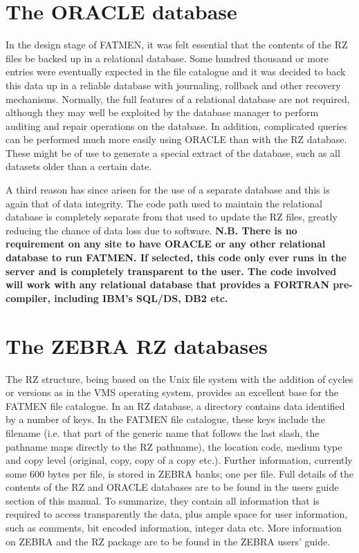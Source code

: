 \section{The ORACLE database}
\par
In the design stage of FATMEN, it was felt essential that the contents
of the RZ files be backed up in a relational database.
Some hundred thousand or more entries were eventually expected
in the file catalogue and it was decided to back this data up
in a reliable database with journaling,
rollback and other recovery mechanisms. Normally, the full features
of a relational database are not required, although they may well
be exploited by the database manager to perform auditing and
repair operations on the database. In addition, complicated queries
can be performed much more easily using ORACLE than with the RZ database.
These might be of use to generate a special extract of the database,
such as all datasets older than a certain date.
\par
A third reason has since arisen for the use of a separate database
and this is again that of data integrity.
The code path used to maintain the relational database is completely
separate from that used to update the RZ files, greatly reducing
the chance of data loss due to software.
{\bf N.B. There is no requirement on any site to have ORACLE or
any other relational database to run FATMEN. If selected,
this code only ever runs in the server and is completely transparent
to the user. The code involved will work with any relational database
that provides a FORTRAN pre-compiler, including IBM's SQL/DS, DB2 etc.
}
\section{The ZEBRA RZ databases}
\par
The RZ structure, being based on the Unix file system with the addition
of cycles or versions as in the VMS operating system, provides an
excellent base for the FATMEN file catalogue. In an RZ database,
a directory contains data identified by a number of keys. In the FATMEN
file catalogue, these keys include the filename (i.e. that part of
the generic name that follows the last slash, the pathname maps
directly to the RZ pathname), the location code, medium
type and copy level (original, copy, copy of a copy etc.).
Further information,
currently some 600 bytes per file, is stored in ZEBRA banks; one per file.
Full details of the contents of the RZ and ORACLE databases are to be
found in the users guide section of this manual.
To summarize, they contain all information
that is required to access transparently the data, plus ample space
for user information, such as comments, bit encoded information, integer
data etc. More information on ZEBRA and the RZ package are to be found
in the ZEBRA users' guide.
